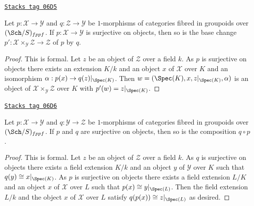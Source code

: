 \begin{lemma}
\label{criteria-lemma-base-change-surjective}
\href{https://stacks.math.columbia.edu/tag/06D5}{\texttt{Stacks tag 06D5}}

Let $p : \mathcal{X} \to \mathcal{Y}$ and $q : \mathcal{Z} \to \mathcal{Y}$
be $1$-morphisms of categories fibred in groupoids over $(\Sch/S)_{fppf}$.
If $p : \mathcal{X} \to \mathcal{Y}$ is surjective on objects, then so
is the base change
$p' : \mathcal{X} \times_\mathcal{Y} \mathcal{Z} \to \mathcal{Z}$
of $p$ by $q$.
\end{lemma}

\begin{proof}
This is formal. Let $z$ be an object of $\mathcal{Z}$ over a field $k$.
As $p$ is surjective on objects there exists an extension $K/k$
and an object $x$ of $\mathcal{X}$ over $K$ and an isomorphism
$\alpha : p(x) \to q(z)|_{\Spec(K)}$. Then
$w = (\Spec(K), x, z|_{\Spec(K)}, \alpha)$ is an object of
$\mathcal{X} \times_\mathcal{Y} \mathcal{Z}$ over $K$ with
$p'(w) = z|_{\Spec(K)}$.
\end{proof}

\begin{lemma}
\label{criteria-lemma-composition-surjective}
\href{https://stacks.math.columbia.edu/tag/06D6}{\texttt{Stacks tag 06D6}}

Let $p : \mathcal{X} \to \mathcal{Y}$ and $q : \mathcal{Y} \to \mathcal{Z}$
be $1$-morphisms of categories fibred in groupoids over $(\Sch/S)_{fppf}$.
If $p$ and $q$ are surjective on objects, then so is the composition
$q \circ p$.
\end{lemma}

\begin{proof}
This is formal. Let $z$ be an object of $\mathcal{Z}$ over a field $k$.
As $q$ is surjective on objects there exists a field extension $K/k$
and an object $y$ of $\mathcal{Y}$ over $K$ such that
$q(y) \cong x|_{\Spec(K)}$. As $p$ is surjective on objects there
exists a field extension $L/K$ and an object $x$ of $\mathcal{X}$
over $L$ such that $p(x) \cong y|_{\Spec(L)}$. Then the field extension
$L/k$ and the object $x$ of $\mathcal{X}$ over $L$ satisfy
$q(p(x)) \cong z|_{\Spec(L)}$ as desired.
\end{proof}

